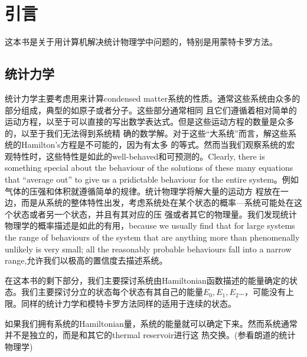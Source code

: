 \chapter{引言}
这本书是关于用计算机解决统计物理学中问题的，特别是用蒙特卡罗方法。
\section{统计力学}
统计力学主要考虑用来计算condensed matter系统的性质。通常这些系统由众多的部分组成，典型的如原子或者分子。这些部分通常相同
且它们遵循着相对简单的运动方程，以至于可以直接的写出数学表达式。但是这些运动方程的数量是众多的，以至于我们无法得到系统精
确的数学解。对于这些\textquotedblleft{大系统}\textquotedblright{}而言，解这些系统的Hamilton's方程是不可能的，因为有太多
的等式。然而当我们观察系统的宏观特性时，这些特性是如此的well-behaved和可预测的。Clearly, there is something special
about the behaviour of the solutions of these many equations that \textquotedblleft{average out}\textquotedblright{} to
give us a pridictable behaviour for the entire system。例如气体的压强和体积就遵循简单的规律。统计物理学将解大量的运动方
程放在一边，而是从系统的整体特性出发，考虑系统处在某个状态的概率---系统可能处在这个状态或者另一个状态，并且有其对应的压
强或者其它的物理量。我们发现统计物理学的概率描述是如此的有用，because we usually find that for large systems the range
of behaviours of the system that are anything more than phenomenally unlikely is very small; all the reasonably probable
behaviours fall into a narrow range,允许我们以极高的置信度去描述系统。

在这本书的剩下部分，我们主要探讨系统由Hamiltonian函数描述的能量确定的状态。我们主要探讨分立的状态\textemdash{}每个状态有其自己的能量$E_{0},E_{1},E_{2}$\dots{}，可能没有上限。同样的统计力学和模特卡罗方法同样的适用于连续的状态。

如果我们拥有系统的Hamiltonian量，系统的能量就可以确定下来。然而系统通常并不是独立的，而是和其它的thermal reservoir进行这
热交换。(参看朗道的统计物理学)

